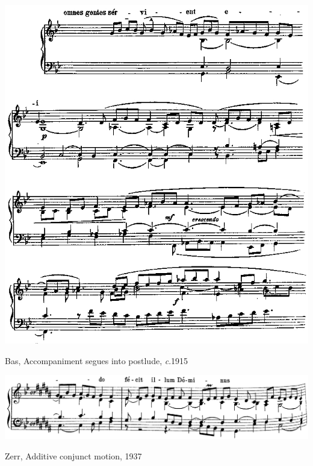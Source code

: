 \vspace*{\fill}

\begin{example}
  \centering
  \includegraphics[width=\linewidth]{c/4/ex/bas_compose.jpeg}
  \caption{Bas, Accompaniment segues into postlude, \emph{c}.1915}
  \label{mus:bas_compose}
\end{example}

\vspace*{\fill}

\newpage

\vspace*{\fill}

\begin{example}
  \centering
  \includegraphics[width=\linewidth]{c/4/ex/zerr_ordo_2.jpg}
  \caption{Zerr, Additive conjunct motion, 1937}
  \label{mus:zerr_ordo_2}
\end{example}


